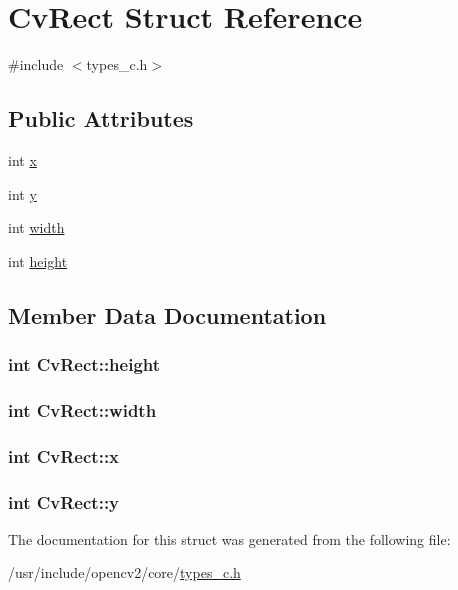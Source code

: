 \hypertarget{structCvRect}{\section{Cv\-Rect Struct Reference}
\label{structCvRect}
}


{\ttfamily \#include $<$types\-\_\-c.\-h$>$}

\subsection*{Public Attributes}
\begin{DoxyCompactItemize}
\item 
int \hyperlink{structCvRect_a4ce08c7287717fe50c94f7690a62dcc3}{x}
\item 
int \hyperlink{structCvRect_a3932af544001ffe9805d0d168e413332}{y}
\item 
int \hyperlink{structCvRect_a2930604866015c2c809c895c43af1dc5}{width}
\item 
int \hyperlink{structCvRect_ac9a593439ca7d36d07d81154592bdcce}{height}
\end{DoxyCompactItemize}


\subsection{Member Data Documentation}
\hypertarget{structCvRect_ac9a593439ca7d36d07d81154592bdcce}{
\subsubsection[{height}]{\setlength{\rightskip}{0pt plus 5cm}int Cv\-Rect\-::height}}\label{structCvRect_ac9a593439ca7d36d07d81154592bdcce}
\hypertarget{structCvRect_a2930604866015c2c809c895c43af1dc5}{
\subsubsection[{width}]{\setlength{\rightskip}{0pt plus 5cm}int Cv\-Rect\-::width}}\label{structCvRect_a2930604866015c2c809c895c43af1dc5}
\hypertarget{structCvRect_a4ce08c7287717fe50c94f7690a62dcc3}{
\subsubsection[{x}]{\setlength{\rightskip}{0pt plus 5cm}int Cv\-Rect\-::x}}\label{structCvRect_a4ce08c7287717fe50c94f7690a62dcc3}
\hypertarget{structCvRect_a3932af544001ffe9805d0d168e413332}{
\subsubsection[{y}]{\setlength{\rightskip}{0pt plus 5cm}int Cv\-Rect\-::y}}\label{structCvRect_a3932af544001ffe9805d0d168e413332}


The documentation for this struct was generated from the following file\-:\begin{DoxyCompactItemize}
\item 
/usr/include/opencv2/core/\hyperlink{core_2types__c_8h}{types\-\_\-c.\-h}\end{DoxyCompactItemize}
